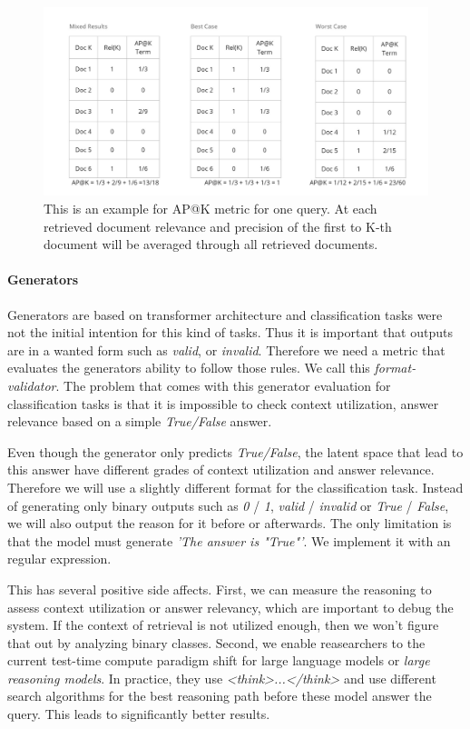 \begin{figure}
  \centering
  \includegraphics[width=\textwidth]{images/APatK.pdf}
  \caption{This is an example for AP@K metric for one query. At each retrieved document relevance and precision of the first to K-th document will be averaged through all retrieved documents.}
  \label{fig:APatK}
\end{figure}


\paragraph{Generators}
Generators are based on transformer architecture and classification tasks were not the initial intention for this kind of tasks. Thus it is important that outputs are in a wanted form such as \textit{valid}, or \textit{invalid}. Therefore we need a metric that evaluates the generators ability to follow those rules. We call this \textit{format-validator}. The problem that comes with this generator evaluation for classification tasks is that it is impossible to check context utilization, answer relevance based on a simple \textit{True/False} answer. 

Even though the generator only predicts \textit{True/False}, the latent space that lead to this answer have different grades of context utilization and answer relevance. Therefore we will use a slightly different format for the classification task. Instead of generating only binary outputs such as \textit{0} / \textit{1}, \textit{valid} / \textit{invalid} or \textit{True} / \textit{False}, we will also output the reason for it before or afterwards. The only limitation is that the model must generate \textit{'The answer is "True"'}. We implement it with an regular expression.

This has several positive side affects. First, we can measure the reasoning to assess context utilization or answer relevancy, which are important to debug the system. If the context of retrieval is not utilized enough, then we won't figure that out by analyzing binary classes. Second, we enable reasearchers to the current test-time compute paradigm shift for large language models or \textit{large reasoning models}. In practice, they use \textit{<think>...</think>} and use different search algorithms for the best reasoning path before these model answer the query. This leads to significantly better results.\cite{Xu.16.01.2025}


